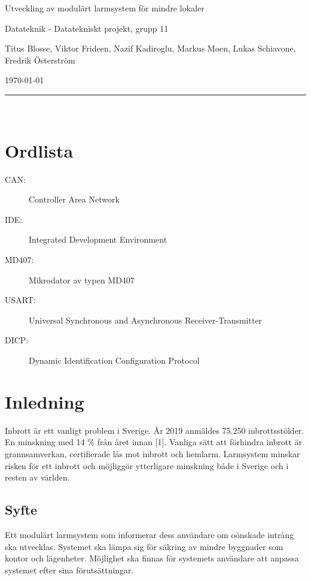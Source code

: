 \documentclass[a4paper]{article}
\begin{document}
\thispagestyle{empty}

\begin{center}
    \parskip=14pt
    \vspace*{3\parskip}

    {\LARGE Utveckling av modulärt larmsystem för mindre lokaler}

    {\large Datateknik - Datatekniskt projekt, grupp 11

    Titus Blosse, Viktor Frideen, Nazif Kadiroglu, Markus Moen, Lukas Schiavone, Fredrik Österström

    \today}

    \rule{7cm}{0.4pt}\\
\end{center}
\newpage

\thispagestyle{empty}

\tableofcontents
\newpage

\thispagestyle{empty}

\section*{Ordlista}

\begin{description}
    \item[CAN:] Controller Area Network
    \item[IDE:] Integrated Development Environment
    \item[MD407:] Mikrodator av typen MD407
    \item[USART:] Universal Synchronous and Asynchronous Receiver-Transmitter
    \item[DICP:] Dynamic Identification Configuration Protocol
\end{description}
\newpage


\section{Inledning}
Inbrott är ett vanligt problem i Sverige.
År 2019 anmäldes 75.250 inbrottsstölder.
En minskning med 14 \% från året innan [1].
Vanliga sätt att förhindra inbrott är grannsamverkan, certifierade lås mot inbrott och hemlarm.
Larmsystem minskar risken för ett inbrott och möjliggör ytterligare minskning både i Sverige och i resten av världen.

\subsection{Syfte}
Ett modulärt larmsystem som informerar dess användare om oönskade intrång ska utvecklas.
Systemet ska lämpa sig för säkring av mindre byggnader som kontor och lägenheter.
Möjlighet ska finnas för systemets användare att anpassa systemet efter sina förutsättningar.
\end{document}

